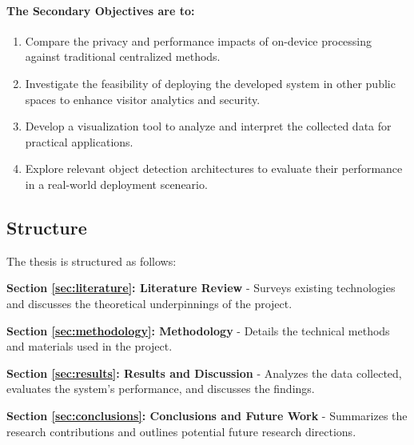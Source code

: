 \paragraph{The Secondary Objectives are to:}
\begin{enumerate}
	\item Compare the privacy and performance impacts of on-device processing against traditional centralized methods.
	\item Investigate the feasibility of deploying the developed system in other public spaces to enhance visitor analytics and security.
	\item Develop a visualization tool to analyze and interpret the collected data for practical applications.
	\item Explore relevant object detection architectures to evaluate their performance in a real-world deployment sceneario.
\end{enumerate}


\subsection{Structure}
\label{sec:structure}
The thesis is structured as follows:

\textbf{Section \ref{sec:literature}: Literature Review} - Surveys existing technologies and discusses the theoretical underpinnings of the project.

\textbf{Section \ref{sec:methodology}: Methodology} - Details the technical methods and materials used in the project.

\textbf{Section \ref{sec:results}: Results and Discussion} - Analyzes the data collected, evaluates the system's performance, and discusses the findings.

\textbf{Section \ref{sec:conclusions}: Conclusions and Future Work} - Summarizes the research contributions and outlines potential future research directions.

